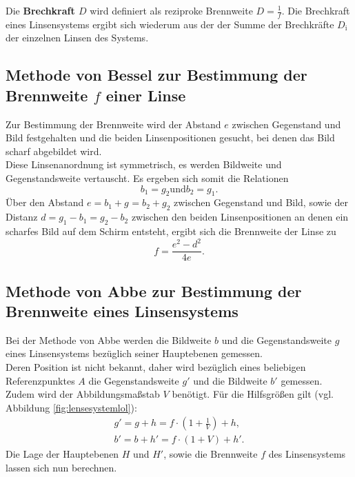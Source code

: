 Die \textbf{Brechkraft $D$} wird definiert als reziproke Brennweite $D=\frac{1}{f}$. Die Brechkraft eines Linsensystems ergibt sich wiederum aus der der Summe der Brechkräfte $D_{\mathrm{i}}$ der einzelnen Linsen des Systems.
\FloatBarrier
\subsection{Methode von Bessel zur Bestimmung der Brennweite $f$ einer Linse}
Zur Bestimmung der Brennweite wird der Abstand $e$ zwischen Gegenstand und Bild festgehalten und die beiden Linsenpositionen gesucht, bei denen das Bild scharf abgebildet wird.\\
Diese Linsenanordnung ist symmetrisch, es werden Bildweite und Gegenstandsweite vertauscht.
Es ergeben sich somit die Relationen
\begin{equation}
b_{\mathrm{1}}=g_{\mathrm{2}} \text{und} b_{\mathrm{2}}=g_{\mathrm{1}} \text{.}
\end{equation}
Über den Abstand $e=b_{\mathrm{1}}+g_{\mathrm{}}=b_{\mathrm{2}}+g_{\mathrm{2}} $ zwischen Gegenstand und Bild, sowie der Distanz $d=g_{\mathrm{1}}-b_{\mathrm{1}}=g_{\mathrm{2}}-b_{\mathrm{2}}$ zwischen den beiden Linsenpositionen an denen ein scharfes Bild auf dem Schirm entsteht,
ergibt sich die Brennweite der Linse zu
\begin{equation}
  \label{eqn:nochmalbessel}
  f=\frac{e^2-d^2}{4e}\text{.}
\end{equation}

\subsection{Methode von Abbe zur Bestimmung der Brennweite eines Linsensystems}
Bei der Methode von Abbe werden die Bildweite $b$ und die Gegenstandsweite $g$ eines Linsensystems bezüglich seiner Hauptebenen gemessen.
\\Deren Position ist nicht bekannt, daher wird bezüglich eines beliebigen Referenzpunktes $A$ die Gegenstandsweite $g'$ und die Bildweite $b'$ gemessen.
\\Zudem wird der Abbildungsmaßstab $V$ benötigt.
Für die Hilfsgrößen gilt (vgl. Abbildung \ref{fig:lensesystemlol}):
\begin{gather}
  \label{eqn:abbe}
  g'=g+h=f\cdot\left(1+\frac{1}{V}\right)+h \text{,}\\
  b'=b+h'=f\cdot\left(1+V\right)+h' \text{.}
\end{gather}
Die Lage der Hauptebenen $H$ und $H'$, sowie die Brennweite $f$ des Linsensystems lassen sich nun berechnen.
